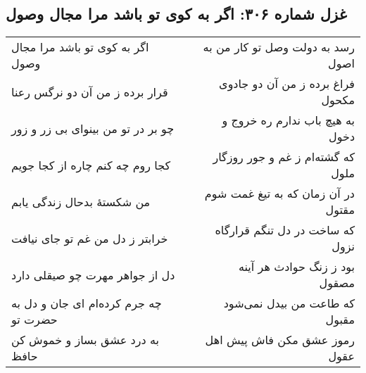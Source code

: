 \begin{center}
\section*{غزل شماره ۳۰۶: اگر به کوی تو باشد مرا مجال وصول}
\label{sec:sh306}
\begin{longtable}{l p{0.5cm} r}
اگر به کوی تو باشد مرا مجال وصول
&&
رسد به دولت وصل تو کار من به اصول
\\
قرار برده ز من آن دو نرگس رعنا
&&
فراغ برده ز من آن دو جادوی مکحول
\\
چو بر در تو من بینوای بی زر و زور
&&
به هیچ باب ندارم ره خروج و دخول
\\
کجا روم چه کنم چاره از کجا جویم
&&
که گشته‌ام ز غم و جور روزگار ملول
\\
من شکستهٔ بدحال زندگی یابم
&&
در آن زمان که به تیغ غمت شوم مقتول
\\
خرابتر ز دل من غم تو جای نیافت
&&
که ساخت در دل تنگم قرارگاه نزول
\\
دل از جواهر مهرت چو صیقلی دارد
&&
بود ز زنگ حوادث هر آینه مصقول
\\
چه جرم کرده‌ام ای جان و دل به حضرت تو
&&
که طاعت من بیدل نمی‌شود مقبول
\\
به درد عشق بساز و خموش کن حافظ
&&
رموز عشق مکن فاش پیش اهل عقول
\\
\end{longtable}
\end{center}
